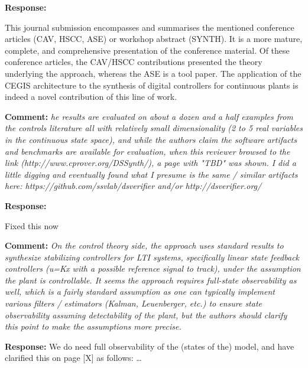\documentclass{article}
\begin{document}
{\bf Response: }

This journal submission encompasses and summarises the mentioned conference articles (CAV, HSCC, ASE) or workshop abstract (SYNTH). 
It is a more mature, complete, and comprehensive presentation of the conference material. 
Of these conference articles, the CAV/HSCC contributions presented the theory underlying the approach, 
whereas the ASE is a tool paper. 
The application of the CEGIS architecture to the synthesis of digital controllers for continuous plants is indeed a novel contribution of this line of work. 


\vspace{2em}
{\bf Comment: } {\itshape he results are evaluated on about a dozen and a half examples from the controls literature all with relatively small
dimensionality (2 to 5 real variables in the continuous state space), and while the authors claim the software artifacts and benchmarks are available
for evaluation, when this reviewer browsed to the link (http://www.cprover.org/DSSynth/), a page with "TBD" was shown. I did a little digging and
eventually found what I presume is the same / similar artifacts here: https://github.com/ssvlab/dsverifier and/or http://dsverifier.org/}

\vspace{1em}
{\bf Response: }

Fixed this now

\vspace{2em}
{\bf Comment: } {\itshape On the control theory side, the approach uses standard results to synthesize stabilizing controllers for LTI systems,
specifically linear state feedback controllers (u=Kx with a possible reference signal to track), under the assumption the plant is controllable. It
seems the approach requires full-state observability as well, which is a fairly standard assumption as one can typically implement various filters /
estimators (Kalman, Leuenberger, etc.) to ensure state observability assuming detectability of the plant, but the authors should clarify this point to
make the assumptions more precise.}

\vspace{1em}
{\bf Response: }
We do need full observability of the (states of the) model, and have clarified this on page [X] as follows: \ldots 
\end{document}
